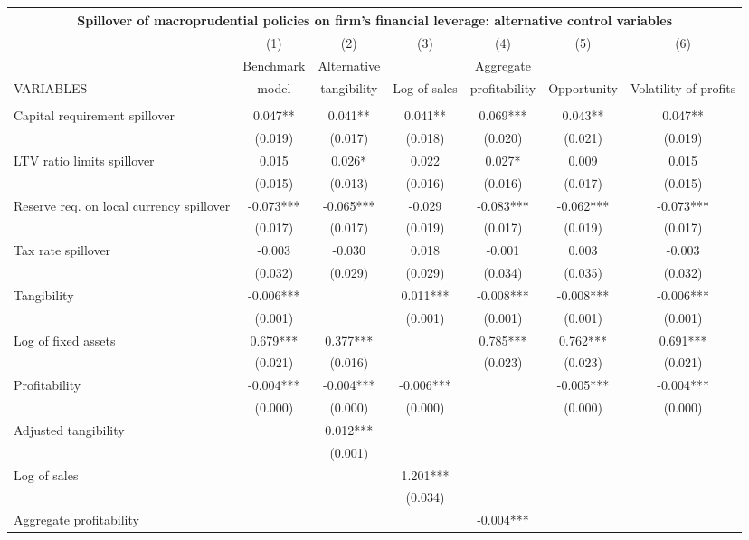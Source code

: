 \begin{tabular}{lcccccc}
\multicolumn{7}{c}{Spillover of macroprudential policies on firm's financial leverage: alternative control variables} \\ \hline
 & (1) & (2) & (3) & (4) & (5) & (6) \\
 & Benchmark & Alternative &  & Aggregate &  &  \\
VARIABLES & model & tangibility & Log of sales & profitability & Opportunity & Volatility of profits \\ \hline
 &  &  &  &  &  &  \\
Capital requirement spillover & 0.047** & 0.041** & 0.041** & 0.069*** & 0.043** & 0.047** \\
 & (0.019) & (0.017) & (0.018) & (0.020) & (0.021) & (0.019) \\
LTV ratio limits spillover & 0.015 & 0.026* & 0.022 & 0.027* & 0.009 & 0.015 \\
 & (0.015) & (0.013) & (0.016) & (0.016) & (0.017) & (0.015) \\
Reserve req. on local currency spillover & -0.073*** & -0.065*** & -0.029 & -0.083*** & -0.062*** & -0.073*** \\
 & (0.017) & (0.017) & (0.019) & (0.017) & (0.019) & (0.017) \\
Tax rate spillover & -0.003 & -0.030 & 0.018 & -0.001 & 0.003 & -0.003 \\
 & (0.032) & (0.029) & (0.029) & (0.034) & (0.035) & (0.032) \\
Tangibility & -0.006*** &  & 0.011*** & -0.008*** & -0.008*** & -0.006*** \\
 & (0.001) &  & (0.001) & (0.001) & (0.001) & (0.001) \\
Log of fixed assets & 0.679*** & 0.377*** &  & 0.785*** & 0.762*** & 0.691*** \\
 & (0.021) & (0.016) &  & (0.023) & (0.023) & (0.021) \\
Profitability & -0.004*** & -0.004*** & -0.006*** &  & -0.005*** & -0.004*** \\
 & (0.000) & (0.000) & (0.000) &  & (0.000) & (0.000) \\
Adjusted tangibility &  & 0.012*** &  &  &  &  \\
 &  & (0.001) &  &  &  &  \\
Log of sales &  &  & 1.201*** &  &  &  \\
 &  &  & (0.034) &  &  &  \\
Aggregate profitability &  &  &  & -0.004*** &  &  \\

\end{tabular}
